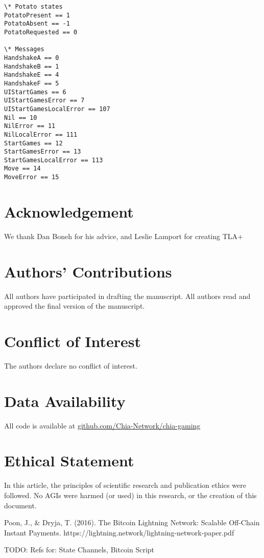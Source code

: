 \documentclass[a4paper]{article}
\begin{document}
\begin{multicols}{2}
\begin{verbatim}
\* Potato states
PotatoPresent == 1
PotatoAbsent == -1
PotatoRequested == 0

\* Messages
HandshakeA == 0
HandshakeB == 1
HandshakeE == 4
HandshakeF == 5
UIStartGames == 6
UIStartGamesError == 7
UIStartGamesLocalError == 107
Nil == 10
NilError == 11
NilLocalError == 111
StartGames == 12
StartGamesError == 13
StartGamesLocalError == 113
Move == 14
MoveError == 15
\end{verbatim}

\twocolumn
\section*{Acknowledgement}
We thank Dan Boneh for his advice, and Leslie Lamport for creating TLA+

\section*{Authors' Contributions}
All authors have participated in drafting the manuscript. All authors read and approved the final version of the manuscript.

\section*{Conflict of Interest}
The authors declare no conflict of interest.

\section*{Data Availability}
All code is available at \href{https://github.com/Chia-Network/chia-gaming}{github.com/Chia-Network/chia-gaming}

\section*{Ethical Statement}
In this article, the principles of scientific research and publication ethics were followed. No AGIs were harmed (or used) in this research, or the creation of this document.

\begin{thebibliography}{8}
 Poon, J., \& Dryja, T. (2016). The Bitcoin Lightning Network:
Scalable Off-Chain Instant Payments. https://lightning.network/lightning-network-paper.pdf

TODO: Refs for: State Channels, Bitcoin Script


\end{thebibliography}

\end{multicols}
\end{document}

